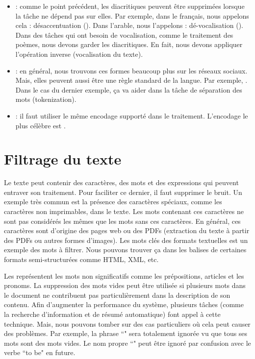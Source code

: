 \documentclass{KodeBook}
\begin{document}
\begin{itemize}
	\item {} : comme le point précédent, les diacritiques peuvent être supprimées lorsque la tâche ne dépend pas sur elles. 
	Par exemple, dans le français, nous appelons cela : désaccentuation ().
	Dans l'arable, nous l'appelons : dé-vocalisation (). 
	Dans des tâches qui ont besoin de vocalisation, comme le traitement des poèmes, nous devons garder les diacritiques. 
	En fait, nous devons appliquer l'opération inverse (vocalisation du texte).
	
	\item {} : en général, nous trouvons ces formes beaucoup plus sur les réseaux sociaux. 
	Mais, elles peuvent aussi être une règle standard de la langue. 
	Par exemple, . 
	Dans le cas du dernier exemple, ça va aider dans la tâche de séparation des mots (tokenization). 
	
	\item {} : il faut utiliser le même encodage supporté dans le traitement. 
	L'encodage le plus célèbre est .

\end{itemize}


\section{Filtrage du texte}

Le texte peut contenir des caractères, des mots et des expressions qui peuvent entraver son traitement. 
Pour faciliter ce dernier, il faut supprimer le bruit. 
Un exemple très commun est la présence des caractères spéciaux, comme les caractères non imprimables, dans le texte. 
Les mots contenant ces caractères ne sont pas considérés les mêmes que les mots sans ces caractères. 
En général, ces caractères sont d'origine des pages web ou des PDFs (extraction du texte à partir des PDFs ou autres formes d'images).
Les mots clés des formats textuelles est un exemple des mots à filtrer. 
Nous pouvons trouver ça dans les balises de certaines formats semi-structurées comme HTML, XML, etc.


Les  représentent les mots non significatifs comme les prépositions, articles et les pronoms.
La suppression des mots vides peut être utilisée si plusieurs mots dans le document ne contribuent pas particulièrement dans la description de son contenu.
Afin d'augmenter la performance du système, plusieurs tâches (comme la recherche d'information et de résumé automatique) font appel à cette technique.
Mais, nous pouvons tomber sur des cas particuliers où cela peut causer des problèmes. 
Par exemple, la phrase ``" sera totalement ignorée vu que tous ses mots sont des mots vides.
Le nom propre ``" peut être ignoré par confusion avec le verbe ``to be" en future.
\end{document}
